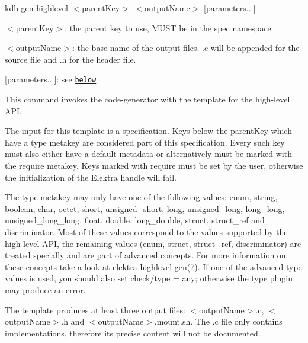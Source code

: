 {\ttfamily kdb gen highlevel $<$parent\+Key$>$ $<$output\+Name$>$ \mbox{[}parameters...\mbox{]}}


\begin{DoxyItemize}
\item {\ttfamily $<$parent\+Key$>$}\+: the parent key to use, M\+U\+ST be in the {\ttfamily spec} namespace
\item {\ttfamily $<$output\+Name$>$}\+: the base name of the output files. {\ttfamily .c} will be appended for the source file and {\ttfamily .h} for the header file.
\item {\ttfamily \mbox{[}parameters...\mbox{]}}\+: see \href{#parameters}{\tt below}
\end{DoxyItemize}

This command invokes the code-\/generator with the template for the high-\/level A\+PI.

The input for this template is a specification. Keys below the {\ttfamily parent\+Key} which have a {\ttfamily type} metakey are considered part of this specification. Every such key must also either have a {\ttfamily default} metadata or alternatively must be marked with the {\ttfamily require} metakey. Keys marked with {\ttfamily require} must be set by the user, otherwise the initialization of the Elektra handle will fail.

The {\ttfamily type} metakey may only have one of the following values\+: {\ttfamily enum}, {\ttfamily string}, {\ttfamily boolean}, {\ttfamily char}, {\ttfamily octet}, {\ttfamily short}, {\ttfamily unsigned\+\_\+short}, {\ttfamily long}, {\ttfamily unsigned\+\_\+long}, {\ttfamily long\+\_\+long}, {\ttfamily unsigned\+\_\+long\+\_\+long}, {\ttfamily float}, {\ttfamily double}, {\ttfamily long\+\_\+double}, {\ttfamily struct}, {\ttfamily struct\+\_\+ref} and {\ttfamily discriminator}. Most of these values correspond to the values supported by the high-\/level A\+PI, the remaining values ({\ttfamily enum}, {\ttfamily struct}, {\ttfamily struct\+\_\+ref}, {\ttfamily discriminator}) are treated specially and are part of advanced concepts. For more information on these concepts take a look at \hyperlink{doc_help_elektra-highlevel-gen_md}{elektra-\/highlevel-\/gen(7)}. If one of the advanced {\ttfamily type} values is used, you should also set {\ttfamily check/type = any}; otherwise the {\ttfamily type} plugin may produce an error.

The template produces at least three output files\+: {\ttfamily $<$output\+Name$>$.c}, {\ttfamily $<$output\+Name$>$.h} and {\ttfamily $<$output\+Name$>$.mount.\+sh}. The {\ttfamily .c} file only contains implementations, therefore its precise content will not be documented.

